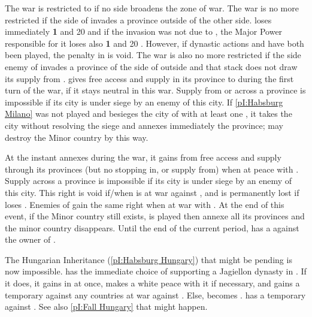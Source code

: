 \phmil
{}
\bparag The war is restricted to \regionItalie if no side broadens the zone of
war.
\bparag The war is no more restricted if the side of \FRA invades a province
outside \regionItalie of the other side. \FRA loses immediately {\bf 1} \STAB
and 20 \VP and if the invasion was not due to \FRA, the Major Power
responsible for it loses also {\bf 1} \STAB and 20 \VP. However, if dynastic
actions  and  have both
been played, the penalty in \VP is void.
\bparag The war is also no more restricted if the side enemy of \FRA invades a
province of the side of \FRA outside \regionItalie and that stack does not
draw its supply from \regionItalie.
\aparag \paysSavoie gives free access and supply in its province to \FRA
during the first turn of the war, if it stays neutral in this war. Supply from
or across a province is impossible if its city is under siege by an enemy of
this city.
\aparag If \ref{pI:Habsburg Milano} was not played and \FRA besieges the city
of \provinceLombardia with at least one \ARMY\faceplus, it takes the city
without resolving the siege and annexes immediately the province; \FRA may
destroy the Minor country \paysMilan by this way.

\effetlong
{}
\bparag At the instant \FRA annexes \provinceLombardia during the war, it
gains from \paysSavoie free access and supply through its provinces (but no
stopping in, or supply from) when at peace with \FRA. Supply across a province
is impossible if its city is under siege by an enemy of this city.
\bparag This right is void if/when \FRA is at war against \paysSavoie, and is
permanently lost if \FRA loses \provinceLombardia.
\bparag Enemies of \FRA gain the same right when at war with \FRA.
\aparag At the end of this event, if the Minor country \paysMilan still
exists,  is played then \HAB annexe all its provinces and
the minor country disappears.
\aparag Until the end of the current period, \FRA has a \CB against the owner
of \provinceLombardia.






\phevnt
\aparag The Hungarian Inheritance (\ref{pI:Habsburg Hungary}) that might be
pending is now impossible.
\aparag \POL has the immediate choice of supporting a Jagiellon dynasty in
\paysHongrie. If it does, it gains \paysHongrie in \MR at once, makes a white
peace with it if necessary, and gains a temporary \CB against any countries at
war against \paysHongrie.
\bparag Else, \paysHongrie becomes \Neutral.
\aparag \HAB has a temporary \CB against \paysHongrie. See also \ref{pI:Fall
  Hungary} that might happen.

